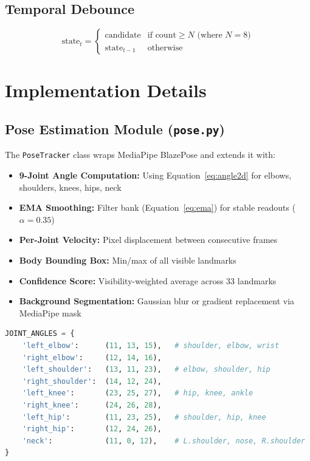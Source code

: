 \documentclass[a4paper,12pt]{report}
\begin{document}
\section{Temporal Debounce}

\begin{equation}
    \text{state}_{t} =
    \begin{cases}
        \text{candidate} & \text{if count} \geq N \text{ (where } N = 8\text{)} \\
        \text{state}_{t-1} & \text{otherwise}
    \end{cases}
    \label{eq:debounce}
\end{equation}

\newpage

\chapter{Implementation Details}
\thispagestyle{contentpages}
\justifying

\section{Pose Estimation Module (\texttt{pose.py})}
The \texttt{PoseTracker} class wraps MediaPipe BlazePose and extends it with:

\begin{itemize}
    \item \textbf{9-Joint Angle Computation:} Using Equation~\ref{eq:angle2d} for elbows, shoulders, knees, hips, neck
    \item \textbf{EMA Smoothing:} Filter bank (Equation~\ref{eq:ema}) for stable readouts ($\alpha = 0.35$)
    \item \textbf{Per-Joint Velocity:} Pixel displacement between consecutive frames
    \item \textbf{Body Bounding Box:} Min/max of all visible landmarks
    \item \textbf{Confidence Score:} Visibility-weighted average across 33 landmarks
    \item \textbf{Background Segmentation:} Gaussian blur or gradient replacement via MediaPipe mask
\end{itemize}

\begin{lstlisting}[language=Python, caption=Joint Angle Definition (JOINT\_ANGLES dict), label=lst:joint_angles]
JOINT_ANGLES = {
    'left_elbow':      (11, 13, 15),   # shoulder, elbow, wrist
    'right_elbow':     (12, 14, 16),
    'left_shoulder':   (13, 11, 23),   # elbow, shoulder, hip
    'right_shoulder':  (14, 12, 24),
    'left_knee':       (23, 25, 27),   # hip, knee, ankle
    'right_knee':      (24, 26, 28),
    'left_hip':        (11, 23, 25),   # shoulder, hip, knee
    'right_hip':       (12, 24, 26),
    'neck':            (11, 0, 12),    # L.shoulder, nose, R.shoulder
}
\end{lstlisting}
\end{document}

